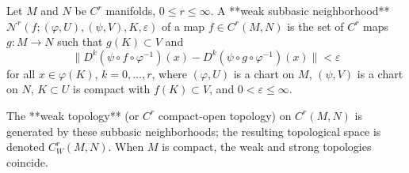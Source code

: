 Let $M$ and $N$ be $C^r$ manifolds, $0 \leq r \leq \infty$. A **weak subbasic neighborhood** $\mathcal{N}^r(f; (\varphi, U), (\psi, V), K, \varepsilon)$ of a map $f \in C^r(M,N)$ is the set of $C^r$ maps $g: M \to N$ such that $g(K) \subset V$ and
$$\| D^k(\psi \circ f \circ \varphi^{-1})(x) - D^k(\psi \circ g \circ \varphi^{-1})(x) \| < \varepsilon$$
for all $x \in \varphi(K)$, $k = 0, \ldots, r$, where $(\varphi, U)$ is a chart on $M$, $(\psi, V)$ is a chart on $N$, $K \subset U$ is compact with $f(K) \subset V$, and $0 < \varepsilon \leq \infty$.

The **weak topology** (or $C^r$ compact-open topology) on $C^r(M,N)$ is generated by these subbasic neighborhoods; the resulting topological space is denoted $C^r_W(M,N)$. When $M$ is compact, the weak and strong topologies coincide.

